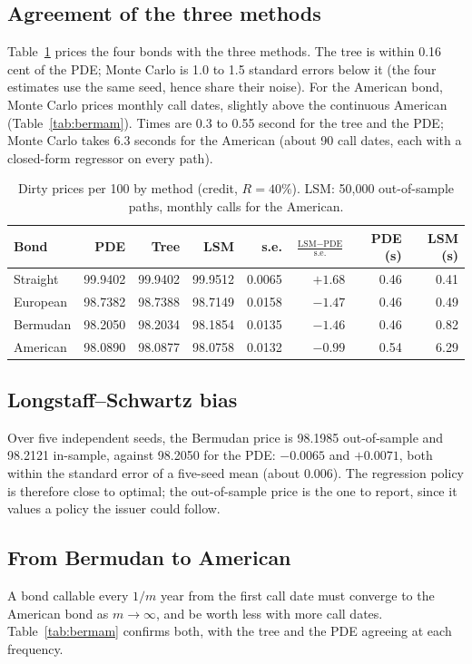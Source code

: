 \documentclass[11pt,a4paper]{article}
\begin{document}
\subsection{Agreement of the three methods}
Table~\ref{tab:methods} prices the four bonds with the three methods. The tree is within 0.16 cent of the PDE;
Monte Carlo is 1.0 to 1.5 standard errors below it (the four estimates use the same seed, hence share their noise).
For the American bond, Monte Carlo prices monthly call dates, slightly above the continuous American
(Table~\ref{tab:bermam}). Times are 0.3 to 0.55 second for the tree and the PDE; Monte Carlo takes
6.3 seconds for the American (about 90 call dates, each with a closed-form regressor on every path).

\begin{table}[h]
\centering
\begin{tabular}{@{}lrrrrrrr@{}}
\toprule
\textbf{Bond} & \textbf{PDE} & \textbf{Tree} & \textbf{LSM} & \textbf{s.e.} & \textbf{$\frac{\text{LSM}-\text{PDE}}{\text{s.e.}}$} & \textbf{PDE (s)} & \textbf{LSM (s)} \\
\midrule
Straight & 99.9402 & 99.9402 & 99.9512 & 0.0065 & $+1.68$ & 0.46 & 0.41 \\
European & 98.7382 & 98.7388 & 98.7149 & 0.0158 & $-1.47$ & 0.46 & 0.49 \\
Bermudan & 98.2050 & 98.2034 & 98.1854 & 0.0135 & $-1.46$ & 0.46 & 0.82 \\
American & 98.0890 & 98.0877 & 98.0758 & 0.0132 & $-0.99$ & 0.54 & 6.29 \\
\bottomrule
\end{tabular}
\caption{Dirty prices per 100 by method (credit, $R = 40\%$). LSM: 50{,}000 out-of-sample paths, monthly calls for the American.}
\label{tab:methods}
\end{table}

\subsection{Longstaff--Schwartz bias}
Over five independent seeds, the Bermudan price is 98.1985 out-of-sample and 98.2121 in-sample, against 98.2050 for
the PDE: $-0.0065$ and $+0.0071$, both within the standard error of a five-seed mean (about 0.006). The regression
policy is therefore close to optimal; the out-of-sample price is the one to report, since it values a policy the
issuer could follow.

\subsection{From Bermudan to American}
A bond callable every $1/m$ year from the first call date must converge to the American bond as $m\to\infty$, and be
worth less with more call dates. Table~\ref{tab:bermam} confirms both, with the tree and the PDE agreeing at each
frequency.
\end{document}
